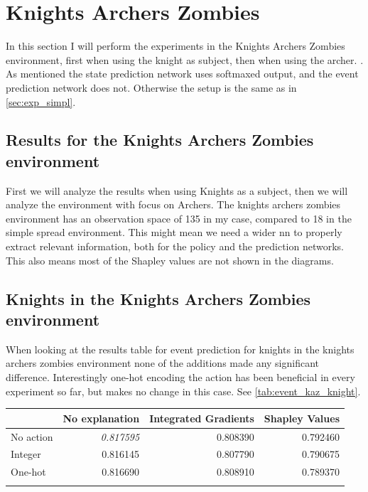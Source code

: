 \documentclass[UKenglish]{uiomasterthesis}
\begin{document}
\section{Knights Archers Zombies}
In this section I will perform the experiments in the Knights Archers Zombies environment, first when using the knight as subject, then when using the archer.
\label{sec:exp_kaz}. As mentioned the state prediction network uses softmaxed output, and the event prediction network does not. Otherwise the setup is the same as in \cref{sec:exp_simpl}.

\subsection{Results for the Knights Archers Zombies environment}
First we will analyze the results when using Knights as a subject, then we will analyze the environment with focus on Archers. The knights archers zombies environment has an observation space of 135 in my case, compared to 18 in the simple spread environment. This might mean we need a wider \ac{nn} to properly extract relevant information, both for the policy and the prediction networks. This also means most of the Shapley values are not shown in the diagrams.

\subsection{Knights in the Knights Archers Zombies environment}

When looking at the results table for event prediction for knights in the knights archers zombies environment none of the additions made any significant difference. Interestingly one-hot encoding the action has been beneficial in every experiment so far, but makes no change in this case. See \cref{tab:event_kaz_knight}.

\begin{center}
\label{tab:event_kaz_knight}
\begin{tabular}{lrrr}
\toprule
 & No explanation & Integrated Gradients & Shapley Values \\
\midrule
No action & \textit{0.817595} & 0.808390 & 0.792460 \\
Integer & 0.816145 & 0.807790 & 0.790675 \\
One-hot & 0.816690 & 0.808910 & 0.789370 \\ 
\bottomrule
\addlinespace[2pt]
\multicolumn{3}{l}{\textsuperscript{***}$p<0.001$, 
  \textsuperscript{**}$p<0.01$, 
  \textsuperscript{*}$p<0.05$}
\end{tabular}
\end{center}
\end{document}
